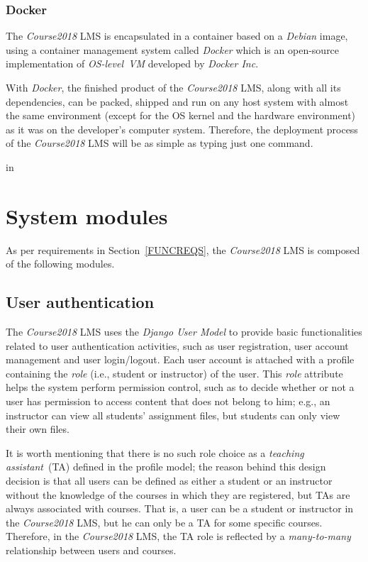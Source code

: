 \subsubsection{Docker}
The \emph{Course2018} LMS is encapsulated in a container based on a
\emph{Debian} image, using a container management system called \emph{Docker}
which is an open-source implementation of \emph{OS-level~VM} developed by
\emph{Docker Inc}.

\medskip

With \emph{Docker}, the finished product of the
\emph{Course2018} LMS, along with all its dependencies, can be packed, shipped
and run on any host system with almost the same environment
(except for the OS kernel and the hardware environment)
as it was on the
developer's computer system. Therefore, the deployment process of the
\emph{Course2018} LMS will be as simple as typing just one command.

 in


\section{System modules}

As per requirements in Section~\ref{FUNCREQS}, the \emph{Course2018} LMS is composed of the
following modules.

\subsection{User authentication}
\label{sec:USRAUTH}
The \emph{Course2018} LMS uses the \emph{Django User Model} \cite{FdjangoUser}
to provide
basic functionalities related to user authentication activities, such as
user registration, user account management and user login/logout.
Each user account is attached with a profile containing the \emph{role}
(i.e., student or instructor) of the user. This \emph{role} attribute helps
the system perform permission control, such as to
decide whether or not a user has permission to access content
that does not belong to him; e.g., an instructor can view all students' assignment
files, but students can only view their own files.

\medskip

It is worth mentioning that there is no such role choice as a \emph{teaching
assistant}~(TA) defined in the profile model;
the reason behind this design decision is that all users can be defined as either a
student or an instructor without the knowledge of the courses in which they are
registered, but TAs are always associated with courses. That is, a user
can be a student or instructor in the \emph{Course2018} LMS, but he can only
be a TA for some specific courses.
Therefore, in the \emph{Course2018} LMS, the TA role is
reflected by a \emph{many-to-many} relationship between users and courses.

